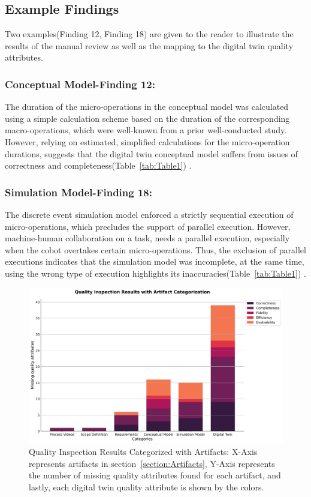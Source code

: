 \documentclass{llncs}
\begin{document}
    \subsection{Example Findings}  
    Two examples(Finding 12, Finding 18) are given to the reader to illustrate 
    the results of the manual review as well as the mapping to the digital twin quality attributes. 

    \subsubsection{Conceptual Model-Finding 12:}

    The duration of the micro-operations in the conceptual model was calculated using a simple calculation 
    scheme based on the duration of the corresponding macro-operations,
     which were well-known from a prior well-conducted study. 
    However, relying on estimated, 
    simplified calculations for the micro-operation durations,
    suggests that the digital twin conceptual model suffers from issues of correctness and completeness(Table~\ref{tab:Table1}) . 

    \subsubsection{Simulation Model-Finding 18:}
        The discrete event simulation model enforced a strictly sequential execution of micro-operations,
        which precludes the support of parallel execution. 
        However, machine-human collaboration on a task, needs a parallel execution, especially when the cobot overtakes certain micro-operations. 
        Thus, the exclusion of parallel executions indicates that the simulation model was incomplete,
        at the same time, using the wrong type of execution highlights its inaccuracies(Table~\ref{tab:Table1}) .
    
    \begin{figure}[htbp]
            \centering
            \includegraphics[scale = 0.35]{quality_inspection_results_with_artifacts.png}
            \caption{Quality Inspection Results Categorized with Artifacts: X-Axis represents artifacts in section~\ref{section:Artifacts}, 
            Y-Axis represents the number of missing quality attributes found for each artifact, 
            and lastly, each digital twin quality attribute is shown by the colors.}
            \label{fig:QualityInspectonResultsWithArtifacts}
    \end{figure}
\end{document}
